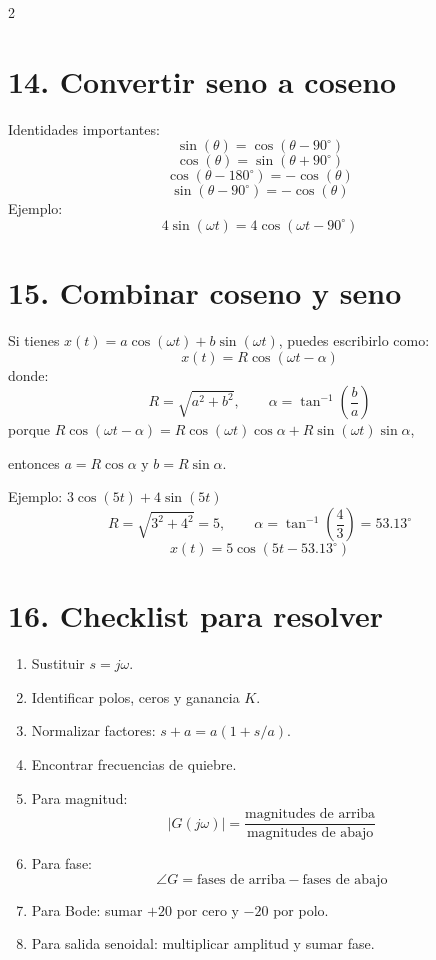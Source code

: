 \documentclass[11pt]{article}
\begin{document}
\begin{multicols}{2}
\section*{14. Convertir seno a coseno}

Identidades importantes:
\[
\sin(\theta)=\cos(\theta-90^\circ)
\]
\[
\cos(\theta)=\sin(\theta+90^\circ)
\]
\[
\cos(\theta-180^\circ)=-\cos(\theta)
\]
\[
\sin(\theta-90^\circ)=-\cos(\theta)
\]
Ejemplo:
\[
4\sin(\omega t)=4\cos(\omega t-90^\circ)
\]

\section*{15. Combinar coseno y seno}

Si tienes $x(t)=a\cos(\omega t)+b\sin(\omega t)$, puedes escribirlo como:
\[
x(t)=R\cos(\omega t-\alpha)
\]
donde:
\[
R=\sqrt{a^2+b^2}, \qquad \alpha=\tan^{-1}\!\left(\frac{b}{a}\right)
\]
porque $R\cos(\omega t-\alpha)=R\cos(\omega t)\cos\alpha+R\sin(\omega t)\sin\alpha$,

entonces $a=R\cos\alpha$ y $b=R\sin\alpha$.

Ejemplo: $3\cos(5t)+4\sin(5t)$
\[
R=\sqrt{3^2+4^2}=5, \qquad \alpha=\tan^{-1}\!\left(\frac{4}{3}\right)=53.13^\circ
\]
\[
x(t)=5\cos(5t-53.13^\circ)
\]

\section*{16. Checklist para resolver}

\begin{enumerate}
\item Sustituir $s=j\omega$.
\item Identificar polos, ceros y ganancia $K$.
\item Normalizar factores: $s+a=a(1+s/a)$.
\item Encontrar frecuencias de quiebre.
\item Para magnitud:
\[
|G(j\omega)|=\frac{\text{magnitudes de arriba}}{\text{magnitudes de abajo}}
\]
\item Para fase:
\[
\angle G = \text{fases de arriba} - \text{fases de abajo}
\]
\item Para Bode: sumar $+20$ por cero y $-20$ por polo.
\item Para salida senoidal: multiplicar amplitud y sumar fase.
\end{enumerate}

\end{multicols}
\end{document}

